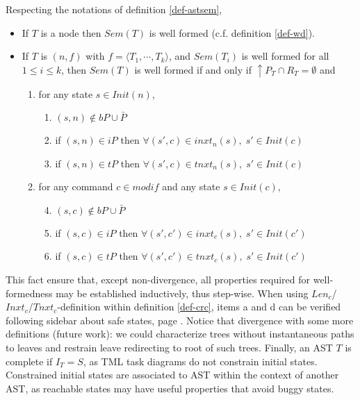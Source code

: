 \documentclass{article}
\begin{document}
\begin{fact}\label{fact-astsem} Respecting the notations of definition \ref{def-astsem},
\begin{itemize}
\item If $T$ is a node then $Sem(T)$ is well formed (c.f. definition \ref{def-wd}).
\item If $T$ is $(n,f)$ with $f=\langle T_1,\cdots,T_k\rangle$, and $Sem(T_i)$ is well formed for all $1\leq i\leq k$, then $Sem(T)$ is well formed if and only if $\uparrow\!\!P_{T}\cap R_T=\emptyset$ and
 \begin{enumerate}
 \item for any state  $s\in Init(n)$, 
       \begin{enumerate}
			 \item $(s,n)\notin bP\cup \bar P$
			 \item if $(s,n)\in iP$ then $\forall (s',c)\in inxt_n(s),\; s'\in Init(c)$
			 \item if $(s,n)\in tP$ then $\forall (s',c)\in tnxt_n(s),\; s'\in Init(c)$
			 \end{enumerate}
			
 \item for any command $c\in modif$ and any state $s\in Init(c)$,
       \begin{enumerate}\setcounter{enumii}{3}
			 \item $(s,c)\notin bP\cup \bar P$
			 \item if $(s,c)\in iP$ then $\forall (s',c')\in inxt_c(s),\; s'\in Init(c')$
			 \item if $(s,c)\in tP$ then $\forall (s',c')\in tnxt_c(s),\; s'\in Init(c')$
			 \end{enumerate}
 \end{enumerate}
\end{itemize}
\end{fact}
This fact ensure that, except non-divergence, all properties required for well-formedness may be establi\-shed inductively, thus step-wise. When using $Len_c$/$Inxt_c$/$T\!nxt_c$-definition within definition \ref{def-crc}, items a and d can be verified following sidebar about safe states, page \pageref{safestates}. Notice that divergence with some more definitions (future work): we could characterize trees without instantaneous paths to leaves and restrain leave redirecting to root of such trees. Finally, an AST $T$ is complete if $I_T=S$, as TML task diagrams do not constrain initial states. Constrained initial states are associated to AST within the context of another AST, as reachable states may have useful properties that avoid buggy states.
\end{document}
